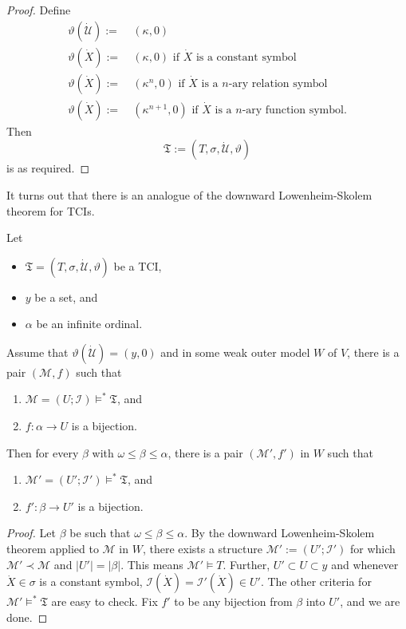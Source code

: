 \documentclass[12pt]{article}
\numberwithin{equation}{section}
\begin{document}
\begin{proof}
Define 
\begin{align*} 
    \vartheta (\dot{\mathcal{U}}) := \ & (\kappa, 0) \\
    \vartheta (\dot{X}) := \ & (\kappa, 0) \text{ if } \dot{X} \text{ is a constant symbol} \\
    \vartheta (\dot{X}) := \ & (\kappa^n, 0)  \text{ if } \dot{X} \text{ is a } n \text{-ary relation symbol} \\
    \vartheta (\dot{X}) := \ & (\kappa^{n + 1}, 0)  \text{ if } \dot{X} \text{ is a } n \text{-ary function symbol.} 
\end{align*}
Then $$\mathfrak{T} := (T, \sigma, \dot{\mathcal{U}}, \vartheta)$$ is as required.
\end{proof}

It turns out that there is an analogue of the downward Lowenheim-Skolem theorem for TCIs.

\begin{lem}\label{DLS}
Let 
\begin{itemize}
    \item $\mathfrak{T} = (T, \sigma, \dot{\mathcal{U}}, \vartheta)$ be a TCI,
    \item $y$ be a set, and
    \item $\alpha$ be an infinite ordinal. 
\end{itemize}
Assume that $\vartheta(\dot{\mathcal{U}}) = (y, 0)$ and in some weak outer model $W$ of $V$, there is a pair $(\mathcal{M}, f)$ such that
\begin{enumerate}[label=(\alph*)]
    \item $\mathcal{M} = (U; \mathcal{I}) \models^* \mathfrak{T}$, and
    \item $f : \alpha \longrightarrow U$ is a bijection.
\end{enumerate}
Then for every $\beta$ with $\omega \leq \beta \leq \alpha$, there is a pair $(\mathcal{M}', f')$ in $W$ such that 
\begin{enumerate}[label=(\alph*)']
    \item $\mathcal{M}' = (U'; \mathcal{I}') \models^* \mathfrak{T}$, and
    \item $f' : \beta \longrightarrow U'$ is a bijection.
\end{enumerate}
\end{lem}

\begin{proof}
Let $\beta$ be such that $\omega \leq \beta \leq \alpha$. By the downward Lowenheim-Skolem theorem applied to $\mathcal{M}$ in $W$, there exists a structure $\mathcal{M}' := (U'; \mathcal{I}')$ for which $\mathcal{M}' \prec \mathcal{M}$ and $|U'| = |\beta|$. This means $\mathcal{M'} \models T$. Further, $U' \subset U \subset y$ and whenever $\dot{X} \in \sigma$ is a constant symbol, $\mathcal{I}(\dot{X}) = \mathcal{I}'(\dot{X}) \in U'$. The other criteria for $\mathcal{M}' \models^* \mathfrak{T}$ are easy to check. Fix $f'$ to be any bijection from $\beta$ into $U'$, and we are done.
\end{proof}
\end{document}
